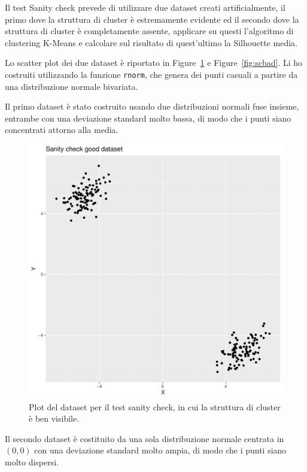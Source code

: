 \documentclass[italian]{article}
\begin{document}
			Il test Sanity check prevede di utilizzare due dataset creati
			artificialmente, il primo dove la struttura di cluster è
			estremamente evidente ed il secondo dove la struttura di
			cluster è completamente assente, applicare su questi l'algoritmo
			di clustering K-Means e calcolare sul risultato di quest'ultimo
			la Silhouette media.

			Lo scatter plot dei due dataset è riportato in
			Figure~\ref{fig:scgood} e Figure~\ref{fig:scbad}.
			Li ho costruiti utilizzando la funzione \texttt{rnorm},
			che genera dei punti casuali a partire da una distribuzione
			normale bivariata.
			
			Il primo dataset è stato costruito usando due distribuzioni
			normali fuse insieme, entrambe con una deviazione standard
			molto bassa, di modo che i punti siano concentrati attorno
			alla media.

			\begin{figure}[h]
				\includegraphics[width = \textwidth]{doc/sc_dataset_good.pdf}
				\caption{Plot del dataset per il test sanity check, in cui
				la struttura di cluster è ben visibile.}
				\label{fig:scgood}
			\end{figure}

			Il secondo dataset è costituito da una sola distribuzione normale
			centrata in $(0, 0)$ con una deviazione standard molto ampia, di
			modo che i punti siano molto dispersi.
\end{document}
